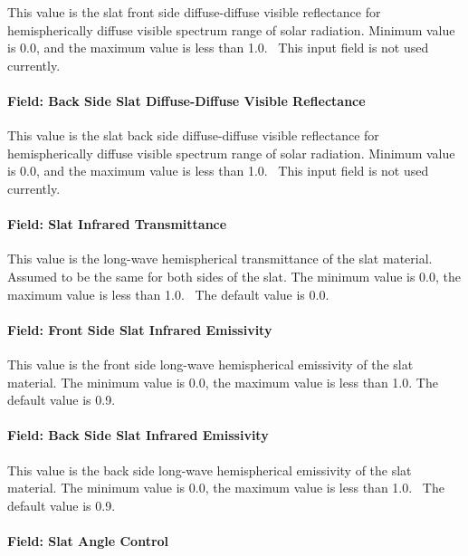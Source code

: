 This value is the slat front side diffuse-diffuse visible reflectance for hemispherically diffuse visible spectrum range of solar radiation. Minimum value is 0.0, and the maximum value is less than 1.0.~ This input field is not used currently.

\paragraph{Field: Back Side Slat Diffuse-Diffuse Visible Reflectance}\label{field-back-side-slat-diffuse-diffuse-visible-reflectance}

This value is the slat back side diffuse-diffuse visible reflectance for hemispherically diffuse visible spectrum range of solar radiation. Minimum value is 0.0, and the maximum value is less than 1.0.~ This input field is not used currently.

\paragraph{Field: Slat Infrared Transmittance}\label{field-slat-Infrared-transmittance}

This value is the long-wave hemispherical transmittance of the slat material. Assumed to be the same for both sides of the slat. The minimum value is 0.0, the maximum value is less than 1.0.~ The default value is 0.0.

\paragraph{Field: Front Side Slat Infrared Emissivity}\label{field-front-side-slat-infrared-emissivity}

This value is the front side long-wave hemispherical emissivity of the slat material. The minimum value is 0.0, the maximum value is less than 1.0. The default value is 0.9.

\paragraph{Field: Back Side Slat Infrared Emissivity}\label{field-back-side-slat-infrared-emissivity}

This value is the back side long-wave hemispherical emissivity of the slat material. The minimum value is 0.0, the maximum value is less than 1.0.~ The default value is 0.9.

\paragraph{Field: Slat Angle Control}\label{field-slat-angle-control}

